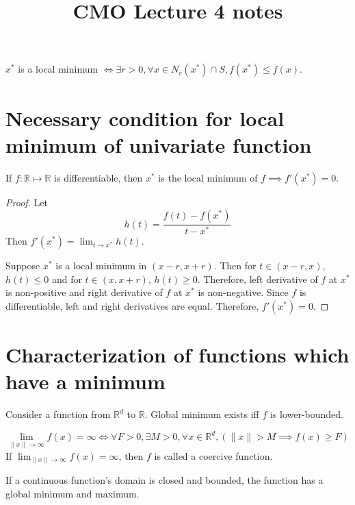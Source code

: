 

\title{CMO Lecture 4 notes}



\maketitle
\initMinimal{}

$x^*$ is a local minimum $\iff \exists r > 0, \forall x \in N_r(x^*) \cap S, f(x^*) \le f(x)$.

\section{Necessary condition for local minimum of univariate function}

\begin{theorem}
If $f: \mathbb{R} \mapsto \mathbb{R}$ is differentiable,
then $x^*$ is the local minimum of $f \implies f'(x^*) = 0$.
\end{theorem}
\begin{proof}
Let
\[ h(t) = \frac{f(t) - f(x^*)}{t - x^*} \]
Then $f'(x^*) = \lim_{t \rightarrow x^*} h(t)$.

Suppose $x^*$ is a local minimum in $(x-r, x+r)$.
Then for $t \in (x-r, x)$, $h(t) \le 0$ and for $t \in (x, x+r)$, $h(t) \ge 0$.
Therefore, left derivative of $f$ at $x^*$ is non-positive
and right derivative of $f$ at $x^*$ is non-negative.
Since $f$ is differentiable, left and right derivatives are equal.
Therefore, $f'(x^*) = 0$.
\end{proof}

\section{Characterization of functions which have a minimum}

Consider a function from $\mathbb{R}^d$ to $\mathbb{R}$.
Global minimum exists iff $f$ is lower-bounded.

\begin{definition}
\[ \lim_{\|x\| \rightarrow \infty} f(x) = \infty
\iff \forall F > 0, \exists M > 0, \forall x \in \mathbb{R}^d,
(\|x\| > M \implies f(x) \ge F) \]
If $\lim_{\|x\| \rightarrow \infty} f(x) = \infty$, then $f$ is called a coercive function.
\end{definition}

\begin{theorem}
If a continuous function's domain is closed and bounded,
the function has a global minimum and maximum.
\end{theorem}

